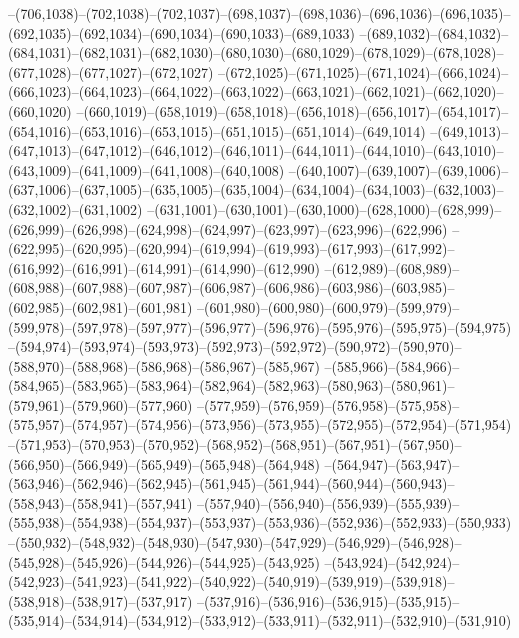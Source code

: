 --(706,1038)--(702,1038)--(702,1037)--(698,1037)--(698,1036)--(696,1036)--(696,1035)--(692,1035)--(692,1034)--(690,1034)--(690,1033)--(689,1033)
--(689,1032)--(684,1032)--(684,1031)--(682,1031)--(682,1030)--(680,1030)--(680,1029)--(678,1029)--(678,1028)--(677,1028)--(677,1027)--(672,1027)
--(672,1025)--(671,1025)--(671,1024)--(666,1024)--(666,1023)--(664,1023)--(664,1022)--(663,1022)--(663,1021)--(662,1021)--(662,1020)--(660,1020)
--(660,1019)--(658,1019)--(658,1018)--(656,1018)--(656,1017)--(654,1017)--(654,1016)--(653,1016)--(653,1015)--(651,1015)--(651,1014)--(649,1014)
--(649,1013)--(647,1013)--(647,1012)--(646,1012)--(646,1011)--(644,1011)--(644,1010)--(643,1010)--(643,1009)--(641,1009)--(641,1008)--(640,1008)
--(640,1007)--(639,1007)--(639,1006)--(637,1006)--(637,1005)--(635,1005)--(635,1004)--(634,1004)--(634,1003)--(632,1003)--(632,1002)--(631,1002)
--(631,1001)--(630,1001)--(630,1000)--(628,1000)--(628,999)--(626,999)--(626,998)--(624,998)--(624,997)--(623,997)--(623,996)--(622,996)
--(622,995)--(620,995)--(620,994)--(619,994)--(619,993)--(617,993)--(617,992)--(616,992)--(616,991)--(614,991)--(614,990)--(612,990)
--(612,989)--(608,989)--(608,988)--(607,988)--(607,987)--(606,987)--(606,986)--(603,986)--(603,985)--(602,985)--(602,981)--(601,981)
--(601,980)--(600,980)--(600,979)--(599,979)--(599,978)--(597,978)--(597,977)--(596,977)--(596,976)--(595,976)--(595,975)--(594,975)
--(594,974)--(593,974)--(593,973)--(592,973)--(592,972)--(590,972)--(590,970)--(588,970)--(588,968)--(586,968)--(586,967)--(585,967)
--(585,966)--(584,966)--(584,965)--(583,965)--(583,964)--(582,964)--(582,963)--(580,963)--(580,961)--(579,961)--(579,960)--(577,960)
--(577,959)--(576,959)--(576,958)--(575,958)--(575,957)--(574,957)--(574,956)--(573,956)--(573,955)--(572,955)--(572,954)--(571,954)
--(571,953)--(570,953)--(570,952)--(568,952)--(568,951)--(567,951)--(567,950)--(566,950)--(566,949)--(565,949)--(565,948)--(564,948)
--(564,947)--(563,947)--(563,946)--(562,946)--(562,945)--(561,945)--(561,944)--(560,944)--(560,943)--(558,943)--(558,941)--(557,941)
--(557,940)--(556,940)--(556,939)--(555,939)--(555,938)--(554,938)--(554,937)--(553,937)--(553,936)--(552,936)--(552,933)--(550,933)
--(550,932)--(548,932)--(548,930)--(547,930)--(547,929)--(546,929)--(546,928)--(545,928)--(545,926)--(544,926)--(544,925)--(543,925)
--(543,924)--(542,924)--(542,923)--(541,923)--(541,922)--(540,922)--(540,919)--(539,919)--(539,918)--(538,918)--(538,917)--(537,917)
--(537,916)--(536,916)--(536,915)--(535,915)--(535,914)--(534,914)--(534,912)--(533,912)--(533,911)--(532,911)--(532,910)--(531,910)
